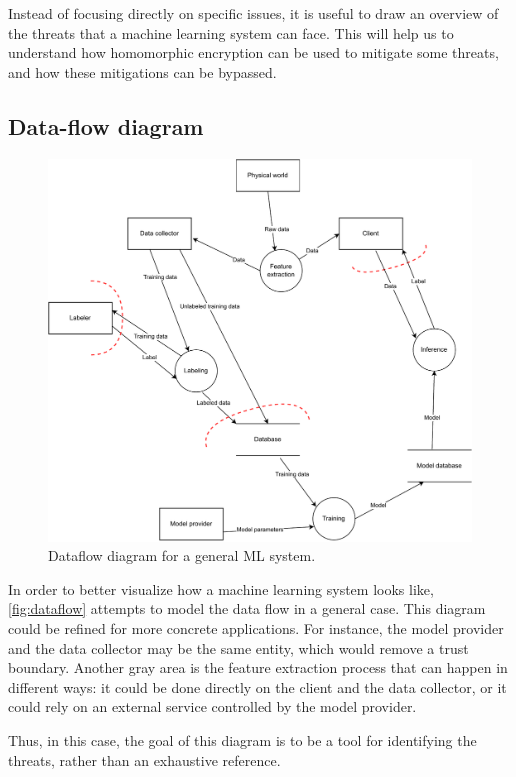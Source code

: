 \documentclass[a4paper,11pt,oneside]{report}
\begin{document}
Instead of focusing directly on specific issues, it is useful to draw an overview of the threats that a machine learning system can face.
This will help us to understand how homomorphic encryption can be used to mitigate some threats, and how these mitigations can be bypassed.

\subsection{Data-flow diagram}

\begin{figure}[p]
    \centering
    \includegraphics[width=\textwidth]{figures/dataflow-ml.pdf}
    \caption{Dataflow diagram for a general ML system.}
    \label{fig:dataflow}
\end{figure}

In order to better visualize how a machine learning system looks like, \autoref{fig:dataflow} attempts to model the data flow in a general case. 
This diagram could be refined for more concrete applications. 
For instance, the model provider and the data collector may be the same entity, which would remove a trust boundary. 
Another gray area is the feature extraction process that can happen in different ways: it could be done directly on the client and the data collector, or it could rely on an external service controlled by the model provider.

Thus, in this case, the goal of this diagram is to be a tool for identifying the threats, rather than an exhaustive reference.
\end{document}
